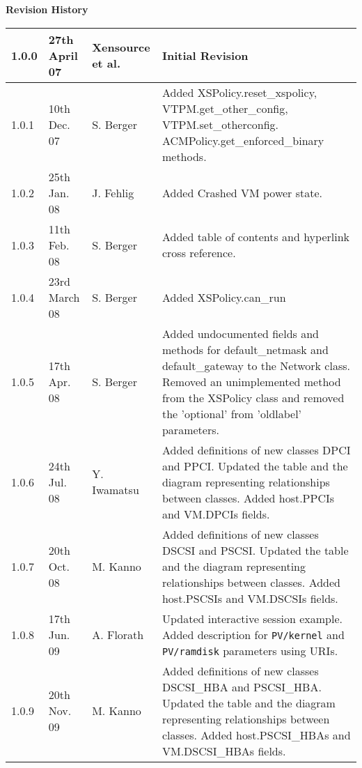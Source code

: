{ \bf Revision History}


\begin{flushleft}
\begin{center}
 \begin{tabular}{|l|l|l|>{\raggedright}p{7cm}|}
  \hline
  1.0.0 & 27th April 07 & Xensource et al. &
     Initial Revision\tabularnewline
  \hline
  1.0.1 & 10th Dec. 07 & S. Berger &
     Added XSPolicy.reset\_xspolicy, VTPM.get\_other\_config,
     VTPM.set\_otherconfig. ACMPolicy.get\_enforced\_binary methods.\tabularnewline
  \hline
  1.0.2 & 25th Jan. 08 & J. Fehlig &
     Added Crashed VM power state.\tabularnewline
  \hline
  1.0.3 & 11th Feb. 08 & S. Berger &
     Added table of contents and hyperlink cross reference.\tabularnewline
  \hline
  1.0.4 & 23rd March 08 & S. Berger &
     Added XSPolicy.can\_run\tabularnewline
  \hline
  1.0.5 & 17th Apr. 08 & S. Berger &
     Added undocumented fields and methods for default\_netmask and
     default\_gateway to the Network class. Removed an unimplemented
     method from the XSPolicy class and removed the 'optional' from
     'oldlabel' parameters.\tabularnewline
  \hline
  1.0.6 & 24th Jul. 08 & Y. Iwamatsu &
     Added definitions of new classes DPCI and PPCI. Updated the table
     and the diagram representing relationships between classes.
     Added host.PPCIs and VM.DPCIs fields.\tabularnewline
  \hline
  1.0.7 & 20th Oct. 08 & M. Kanno &
     Added definitions of new classes DSCSI and PSCSI. Updated the table
     and the diagram representing relationships between classes.
     Added host.PSCSIs and VM.DSCSIs fields.\tabularnewline
  \hline
  1.0.8 & 17th Jun. 09 & A. Florath &
     Updated interactive session example.
     Added description for \texttt{PV/kernel} and \texttt{PV/ramdisk}
     parameters using URIs.\tabularnewline
  \hline
  1.0.9 & 20th Nov. 09 & M. Kanno &
     Added definitions of new classes DSCSI\_HBA and PSCSI\_HBA.
     Updated the table and the diagram representing relationships
     between classes. Added host.PSCSI\_HBAs and VM.DSCSI\_HBAs
     fields.\tabularnewline
  \hline
 \end{tabular}
\end{center}
\end{flushleft}
